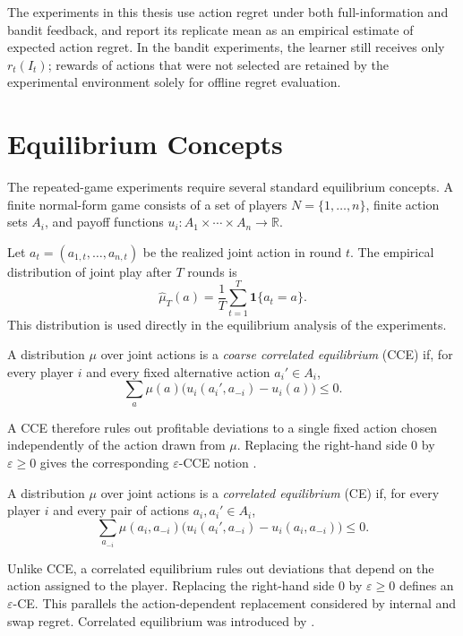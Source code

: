 The experiments in this thesis use action regret under both full-information
and bandit feedback, and report its replicate mean as an empirical estimate of
expected action regret. In the bandit experiments, the learner still receives
only \(r_t(I_t)\); rewards of actions that were not selected are retained by
the experimental environment solely for offline regret evaluation.


\section{Equilibrium Concepts}
\label{sec:equilibrium-concepts}

The repeated-game experiments require several standard equilibrium concepts.
A finite normal-form game consists of a set of players
\(N=\{1,\ldots,n\}\), finite action sets \(A_i\), and payoff functions
\(u_i:A_1\times\cdots\times A_n\rightarrow\mathbb{R}\).

Let \(a_t=(a_{1,t},\ldots,a_{n,t})\) be the realized joint action in round
\(t\). The empirical distribution of joint play after \(T\) rounds is
\[
    \widehat{\mu}_T(a)
    =
    \frac{1}{T}
    \sum_{t=1}^{T}
    \mathbf{1}\{a_t=a\}.
\]
This distribution is used directly in the equilibrium analysis of the
experiments.

\begin{definition}
A distribution \(\mu\) over joint actions is a
\emph{coarse correlated equilibrium} (CCE) if, for every player \(i\) and
every fixed alternative action \(a_i'\in A_i\),
\[
    \sum_a
    \mu(a)
    \bigl(
        u_i(a_i',a_{-i})-u_i(a)
    \bigr)
    \leq0.
\]
\end{definition}

A CCE therefore rules out profitable deviations to a single fixed action
chosen independently of the action drawn from \(\mu\). Replacing the right-hand
side \(0\) by \(\varepsilon\geq0\) gives the corresponding
\(\varepsilon\)-CCE notion \citep{leme_convergence_2024}.

\begin{definition}
A distribution \(\mu\) over joint actions is a
\emph{correlated equilibrium} (CE) if, for every player \(i\) and every pair
of actions \(a_i,a_i'\in A_i\),
\[
    \sum_{a_{-i}}
    \mu(a_i,a_{-i})
    \bigl(
        u_i(a_i',a_{-i})
        -
        u_i(a_i,a_{-i})
    \bigr)
    \leq0.
\]
\end{definition}

Unlike CCE, a correlated equilibrium rules out deviations that depend on the
action assigned to the player. Replacing the right-hand side \(0\) by
\(\varepsilon\geq0\) defines an \(\varepsilon\)-CE. This parallels the
action-dependent replacement considered by internal and swap regret.
Correlated equilibrium was introduced by \citet{aumann_subjectivity_1974}.

